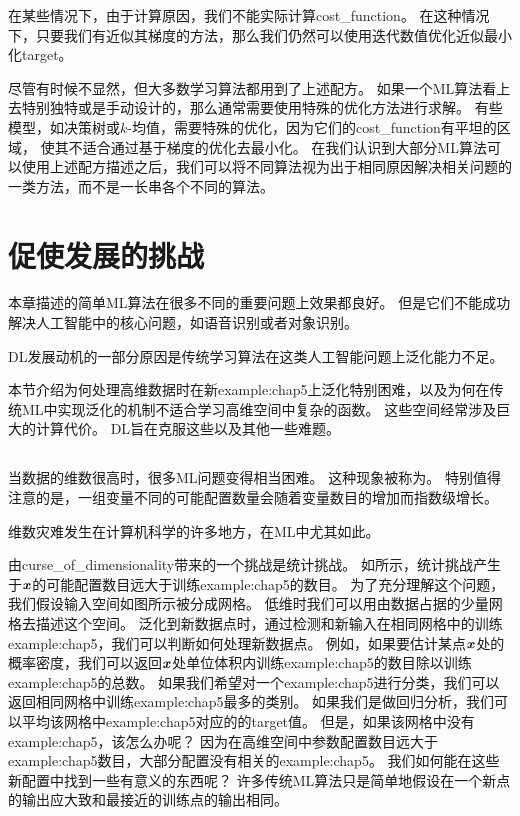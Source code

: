 在某些情况下，由于计算原因，我们不能实际计算\gls{cost_function}。
在这种情况下，只要我们有近似其梯度的方法，那么我们仍然可以使用迭代数值优化近似最小化\gls{target}。

尽管有时候不显然，但大多数学习算法都用到了上述配方。
如果一个\gls{ML}算法看上去特别独特或是手动设计的，那么通常需要使用特殊的优化方法进行求解。
有些模型，如决策树或$k$-均值，需要特殊的优化，因为它们的\gls{cost_function}有平坦的区域，
使其不适合通过基于梯度的优化去最小化。
在我们认识到大部分\gls{ML}算法可以使用上述配方描述之后，我们可以将不同算法视为出于相同原因解决相关问题的一类方法，而不是一长串各个不同的算法。


\section{促使发展的挑战}
\label{sec:challenges_motivating_deep_learning}
本章描述的简单\gls{ML}算法在很多不同的重要问题上效果都良好。
但是它们不能成功解决人工智能中的核心问题，如语音识别或者对象识别。

\gls{DL}发展动机的一部分原因是传统学习算法在这类人工智能问题上泛化能力不足。

本节介绍为何处理高维数据时在新\gls{example:chap5}上泛化特别困难，以及为何在传统\gls{ML}中实现泛化的机制不适合学习高维空间中复杂的函数。
这些空间经常涉及巨大的计算代价。
\gls{DL}旨在克服这些以及其他一些难题。

\subsection{}
\label{sec:the_curse_of_dimensionality}
当数据的维数很高时，很多\gls{ML}问题变得相当困难。
这种现象被称为。
特别值得注意的是，一组变量不同的可能配置数量会随着变量数目的增加而指数级增长。

维数灾难发生在计算机科学的许多地方，在\gls{ML}中尤其如此。

由\gls{curse_of_dimensionality}带来的一个挑战是统计挑战。
如所示，统计挑战产生于$\boldsymbol{\mathit{x}}$的可能配置数目远大于训练\gls{example:chap5}的数目。
为了充分理解这个问题，我们假设输入空间如图所示被分成网格。
低维时我们可以用由数据占据的少量网格去描述这个空间。
泛化到新数据点时，通过检测和新输入在相同网格中的训练\gls{example:chap5}，我们可以判断如何处理新数据点。
例如，如果要估计某点$\boldsymbol{\mathit{x}}$处的概率密度，我们可以返回$\boldsymbol{\mathit{x}}$处单位体积内训练\gls{example:chap5}的数目除以训练\gls{example:chap5}的总数。
如果我们希望对一个\gls{example:chap5}进行分类，我们可以返回相同网格中训练\gls{example:chap5}最多的类别。
如果我们是做回归分析，我们可以平均该网格中\gls{example:chap5}对应的的\gls{target}值。
但是，如果该网格中没有\gls{example:chap5}，该怎么办呢？  
因为在高维空间中参数配置数目远大于\gls{example:chap5}数目，大部分配置没有相关的\gls{example:chap5}。 %
我们如何能在这些新配置中找到一些有意义的东西呢？
许多传统\gls{ML}算法只是简单地假设在一个新点的输出应大致和最接近的训练点的输出相同。



